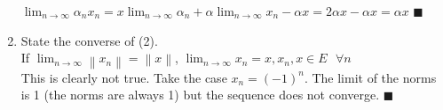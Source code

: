 \documentclass[12pt]{article}
\newcommand{\norm}[1]{\left \lVert#1\right\rVert}
\begin{document}
\begin{enumerate}
$\lim_{n\to\infty}\alpha_nx_n = x\lim_{n\to\infty}\alpha_n + \alpha\lim_{n\to\infty}x_n - \alpha x = 2\alpha x -\alpha x = \alpha x$ $\blacksquare$\\
\item State the converse of (2).\\
If $\lim_{n\to\infty}\norm{x_n} = \norm{x}$, $\lim_{n\to\infty}x_n = x, x_n,x \in E \text{ }\forall n$\\
This is clearly not true.  Take the case $x_n = (-1)^n$.  The limit of the norms is 1 (the norms are always 1) but the sequence does not converge. $\blacksquare$
\end{enumerate}
\end{document}
